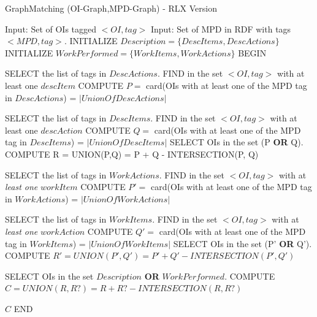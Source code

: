 \documentclass[a4paper,english,submission]{rnti}  %
\begin{document}
\begin{algorithm}[h]\scriptsize
 \caption{GraphMatching (OI-Graph,MPD-Graph) - RLX Version}
\label{graphmatching}
\begin{algorithmic}[1]
\STATE Input: Set of OIs tagged  $<OI, tag>$ 
\STATE Input: Set of MPD in RDF with tags  $<MPD, tag>$.
\STATE INITIALIZE $Description = \{DescItems, DescActions\}$
\STATE INITIALIZE $WorkPerformed = \{WorkItems, WorkActions\} $
\STATE BEGIN
		
		\STATE SELECT the list of tags in $DescActions$.
		\STATE FIND in the set $<OI, tag>$ with at least one $descItem$
		\STATE COMPUTE $P =$ card(OIs with at least one of the MPD tag in $DescActions$) = $|UnionOfDescActions|$
         		 
		\STATE SELECT the list of tags in $DescItems$.
	    \STATE FIND in the set $<OI, tag>$ with at least one $descAction$
		\STATE COMPUTE $Q =$ card(OIs with at least one of the MPD tag in $DescItems$) = $|UnionOfDescItems|$
		\STATE SELECT OIs in the set (P \textbf{OR} Q).
	    \STATE COMPUTE R = UNION(P,Q) = P + Q - INTERSECTION(P, Q) 
 	
 \ENDFOR	    		
	
		
		\STATE SELECT the list of tags in $WorkActions$.
		\STATE FIND in the set $<OI, tag>$ with at \textit{least one} $workItem$
		\STATE COMPUTE $P' =$ card(OIs with at least one of the MPD tag in $WorkActions$) = $|UnionOfWorkActions|$
         		 
		\STATE SELECT the list of tags in $WorkItems$.
	    \STATE FIND in the set $<OI, tag>$ with at \textit{least one} $workAction$
		\STATE COMPUTE $Q' =$ card(OIs with at least one of the MPD tag in $WorkItems$) = $|UnionOfWorkItems|$
		\STATE SELECT OIs in the set (P' \textbf{OR} Q').
	    \STATE COMPUTE $R' = UNION(P',Q') = P' + Q' - INTERSECTION(P', Q') $
 	
 \ENDFOR	  
 
  \STATE SELECT OIs in the set $Description$ \textbf{OR} $WorkPerformed$.	
   \STATE COMPUTE $C =UNION(R, R?) = R + R? - INTERSECTION (R, R?) $


    \RETURN $C$
  \STATE END
\end{algorithmic}
\end{algorithm}
 



 
\end{document}
